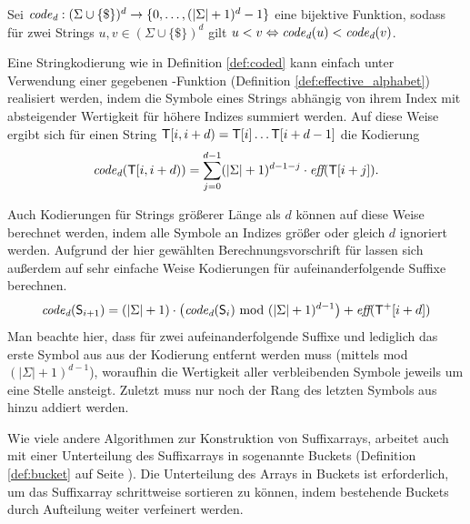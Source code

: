 \begin{definition}[Stringkodierung]
	\label{def:coded}
	Sei \(\textit{code\textsubscript{d}} : (\Sigma \cup \{\$\})^d \rightarrow \{0, \ldots, (|\Sigma| + 1)^d - 1\}\) eine bijektive Funktion, sodass für zwei Strings \(u, v \in (\Sigma \cup \{\$\})^d\) gilt \(u < v \Leftrightarrow \textit{code\textsubscript{d}}(u) < \textit{code\textsubscript{d}}(v)\).
\end{definition}

Eine Stringkodierung wie in Definition \ref{def:coded} kann einfach unter Verwendung einer gegebenen \effective-Funktion (Definition \ref{def:effective_alphabet}) realisiert werden, indem die Symbole eines Strings abhängig von ihrem Index mit absteigender Wertigkeit für höhere Indizes summiert werden. Auf diese Weise ergibt sich für einen String \(\inputtext{[i,i+d)} = \inputtext[i] \ldots \inputtext[i + d - 1]\) die Kodierung \[\coded(\inputtext{[i,i+d)}) = \sum_{j=0}^{d - 1} (|\Sigma| + 1)^{d - 1 - j} \cdot \effective(\inputtext[i + j]).\]\par\smallskip
Auch Kodierungen für Strings größerer Länge als \(d\) können auf diese Weise berechnet werden, indem alle Symbole an Indizes größer oder gleich \(d\) ignoriert werden. Aufgrund der hier gewählten Berechnungsvorschrift für \coded lassen sich außerdem auf sehr einfache Weise Kodierungen für aufeinanderfolgende Suffixe berechnen.
\begin{equation}
	\label{eq:coded}
    \coded(\suffix{i+1}) = (|\Sigma| + 1) \cdot \left( \coded(\suffix{i}) \text{ mod } (|\Sigma| + 1)^{d-1}\right) + \effective(\inputtextplus[i+d])
\end{equation}
Man beachte hier, dass für zwei aufeinanderfolgende Suffixe  und  lediglich das erste Symbol aus  aus der Kodierung entfernt werden muss (mittels mod \((|\Sigma| + 1)^{d-1}\)), woraufhin die Wertigkeit aller verbleibenden Symbole jeweils um eine Stelle ansteigt. Zuletzt muss nur noch der Rang des letzten Symbols aus  hinzu addiert werden.\par\smallskip
Wie viele andere Algorithmen zur Konstruktion von Suffixarrays, arbeitet auch \bpr mit einer Unterteilung des Suffixarrays in sogenannte Buckets (Definition \ref{def:bucket} auf Seite \pageref{def:bucket}). Die Unterteilung des Arrays in Buckets ist erforderlich, um das Suffixarray schrittweise sortieren zu können, indem bestehende Buckets durch Aufteilung weiter verfeinert werden.
